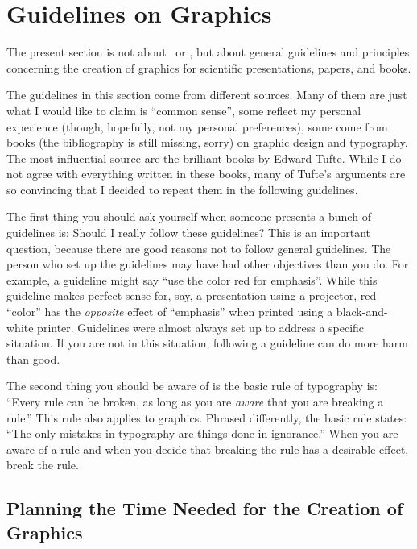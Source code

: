 %
%
%


\section[guidelines]{Guidelines on Graphics}

The present section is not about \pgfname\ or \tikzname, but about general
guidelines and principles concerning the creation of graphics for scientific
presentations, papers, and books.

The guidelines in this section come from different sources. Many of them are
just what I would like to claim is ``common sense'', some reflect my personal
experience (though, hopefully, not my personal preferences), some come from
books (the bibliography is still missing, sorry) on graphic design and
typography. The most influential source  are the brilliant books by Edward
Tufte. While I do not agree with everything written in these books, many of
Tufte's arguments are so convincing that I decided to repeat them in the
following guidelines.

The first thing you should ask yourself when someone presents a bunch of
guidelines is: Should I really follow these guidelines? This is an important
question, because there are good reasons not to follow general guidelines. The
person who set up the guidelines may have had other objectives than you do. For
example, a guideline might say ``use the color red for emphasis''. While this
guideline makes perfect sense for, say, a presentation using a projector, red
``color'' has the \emph{opposite} effect of ``emphasis'' when printed using a
black-and-white printer. Guidelines were almost always set up to address a
specific situation. If you are not in this situation, following a guideline can
do more harm than good.

The second thing you should be aware of is the basic rule of typography is:
``Every rule can be broken, as long as you are \emph{aware} that you are
breaking a rule.'' This rule also applies to graphics. Phrased differently, the
basic rule states: ``The only mistakes in typography are things done in
ignorance.'' When you are aware of a rule and when you decide that breaking the
rule has a desirable effect, break the rule.


\subsection{Planning the Time Needed for the Creation of Graphics}

